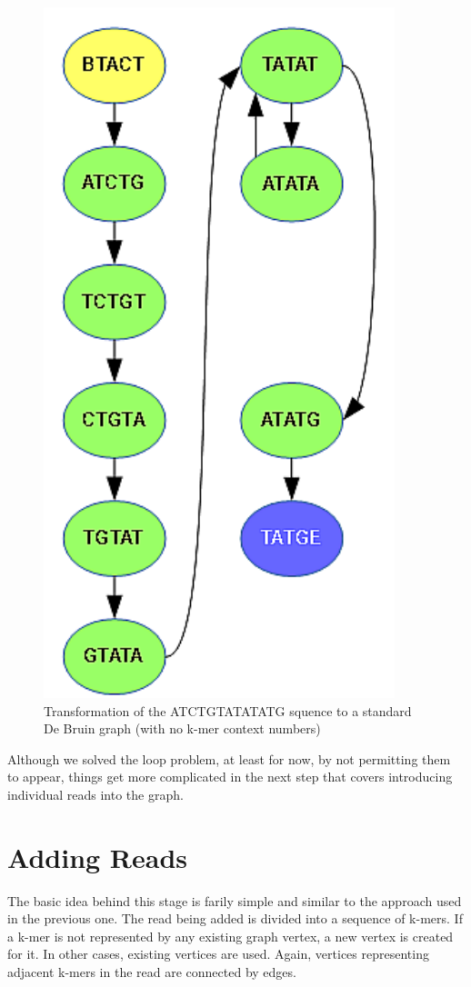 \begin{figure}[h]
	\centering
	\includegraphics{img/ref-db.pdf}
	\caption{Transformation of the ATCTGTATATATG squence to a standard De Bruin graph (with no k-mer context numbers)}
	\label{fig:ref-db}
\end{figure}

Although we solved the loop problem, at least for now, by not permitting them to appear, things get more complicated in the next step that covers introducing individual reads into the graph. 

\section{Adding Reads}

The basic idea behind this stage is farily simple and similar to the approach used in the previous one. The read being added is divided into a sequence of k-mers. If a k-mer is not represented by any existing graph vertex, a new vertex is created for it. In other cases, existing vertices are used. Again, vertices representing adjacent k-mers in the read are connected by edges. 

